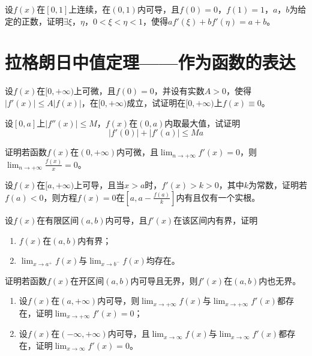 \begin{example}
	设$f(x)$在$[0,1]$上连续，在$(0,1)$内可导，且$f(0)=0$，$f(1)=1$，$a$，$b$为给定的正数，证明$\exists\xi$，$\eta$，$0<\xi<\eta<1$，使得$af'(\xi)+bf'(\eta)=a+b$。
\end{example}

\section{拉格朗日中值定理——作为函数的表达}

\begin{example}
	设$f(x)$在$[0,+\infty)$上可微，且$f(0)=0$，并设有实数$A>0$，使得$|f'(x)|\leqslant A|f(x)|$，在$[0,+\infty)$成立，试证明在$[0,+\infty)$上$f(x)\equiv 0$。
\end{example}

\begin{example}
	设$[0,a]$上$|f''(x)|\leqslant M$，$f(x)$在$(0,a)$内取最大值，试证明\[|f'(0)|+|f'(a)|\leqslant Ma\]
\end{example}

\begin{example}
	证明若函数$f(x)$在$(0,+\infty)$内可微，且$\lim_{n\to+\infty}f'(x)=0$，则$\lim_{n\to+\infty}\frac{f(x)}{x}=0$。
\end{example}

\begin{example}
	设$f(x)$在$[a,+\infty)$上可导，且当$x>a$时，$f'(x)>k>0$，其中$k为常数$，证明若$f(a)<0$，则方程$f(x)=0$在$[a,a-\frac{f(a)}{k}]$内有且仅有一个实根。
\end{example}

\begin{example}
	设$f(x)$在有限区间$(a,b)$内可导，且$f'(x)$在该区间内有界，证明
	\begin{enumerate}
		\item $f(x)$在$(a,b)$内有界；
		\item $\lim_{x\to a^+}f(x)$与$\lim_{x\to b^-}f(x)$均存在。
	\end{enumerate}
\end{example}

\begin{example}
	证明若函数$f(x)$在开区间$(a,b)$内可导且无界，则$f'(x)$在$(a,b)$内也无界。
\end{example}

\begin{example}
	\begin{enumerate}
		\item 设$f(x)$在$(a,+\infty)$内可导，则$\lim_{x\to+\infty}f(x)$与$\lim_{x\to+\infty}f'(x)$都存在，证明$\lim_{x\to+\infty}f'(x)=0$；
		\item 设$f(x)$在$(-\infty,+\infty)$内可导，且$\lim_{x\to\infty}f(x)$与$\lim_{x\to\infty}f'(x)$都存在，证明$\lim_{x\to\infty}f'(x)=0$。
	\end{enumerate}
\end{example}

